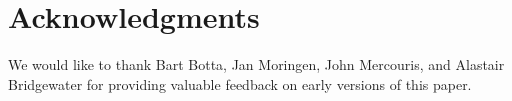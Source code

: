 \section{Acknowledgments} 

We would like to thank Bart Botta, Jan Moringen, John Mercouris, and
Alastair Bridgewater for providing valuable feedback on early versions
of this paper.
